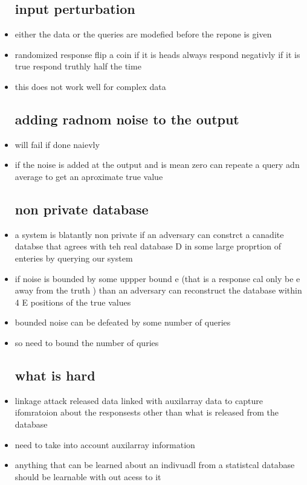 \documentclass{article}
\begin{document}
\begin{itemize}
\subsection*{input perturbation }
\item either the data or the queries are modefied before the repone is given 
\item randomized response flip a coin if it is heads always respond negativly if it is true respond truthly half the time 
\item this does not work well for complex data 
\subsection*{adding radnom noise to the output}
\item will fail if done naievly 
\item if the noise is added at the output and is mean zero can repeate a query adn average to get an aproximate true value 
\subsection*{non private database}
\item a system is blatantly non private if an adversary can constrct a canadite databse that agrees with teh real database D in some large proprtion of enteries by querying our system 
\item if noise is bounded by some uppper bound e (that is a response cal only be e away from the truth ) than an adversary can reconstruct the database within 4 E positions of the true values 
\item bounded noise can be defeated by some number of queries 
\item so need to bound the number of quries 
\subsection*{what is hard }
\item linkage attack released data linked with auxilarray data to capture ifomratoion about the responsests other than what is released from the database 
\item need to take into account auxilarray information
\item anything that can be learned about an indivuadl from a statistcal database should be learnable with out acess to it 

\end{itemize}
\end{document}
